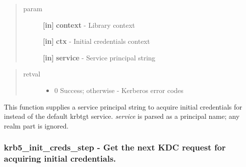 \documentclass[letterpaper,10pt,english]{sphinxmanual}
\begin{document}
\begin{quote}\begin{description}
\item[{param}] \leavevmode
\textbf{{[}in{]}} \textbf{context} - Library context

\textbf{{[}in{]}} \textbf{ctx} - Initial credentials context

\textbf{{[}in{]}} \textbf{service} - Service principal string

\end{description}\end{quote}
\begin{quote}\begin{description}
\item[{retval}] \leavevmode\begin{itemize}
\item {} 
0   Success; otherwise - Kerberos error codes

\end{itemize}

\end{description}\end{quote}

This function supplies a service principal string to acquire initial credentials for instead of the default krbtgt service. \emph{service} is parsed as a principal name; any realm part is ignored.


\subsubsection{krb5\_init\_creds\_step -  Get the next KDC request for acquiring initial credentials.}
\label{appdev/refs/api/krb5_init_creds_step::doc}\label{appdev/refs/api/krb5_init_creds_step:krb5-init-creds-step-get-the-next-kdc-request-for-acquiring-initial-credentials}

\begin{fulllineitems}
\label{appdev/refs/api/krb5_init_creds_step:c.krb5_init_creds_step}
\end{fulllineitems}
\end{document}
